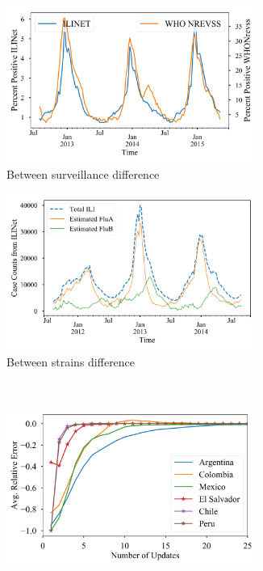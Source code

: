 \documentclass[a4paper]{article}
\begin{document}
\begin{figure}[!h]
  \centering
  \begin{subfigure}[t]{0.45\linewidth}
    \begin{center}
    \includegraphics[width=0.9\textwidth]{./ilinet_vs_nrevss.png}
    \caption{Between surveillance difference}
    \end{center}
  \end{subfigure}
  \begin{subfigure}[t]{0.45\linewidth}
    \begin{center}
    \includegraphics[width=0.9\textwidth]{./ilinet_subtyped.png}
    \caption{Between strains difference}
    \end{center}
  \end{subfigure}
  \\
  \begin{subfigure}[t]{0.45\linewidth}
    \begin{center}
    \includegraphics[width=0.9\textwidth]{./ili_updates.png}

\end{center}
\end{subfigure}
\end{figure}
\end{document}
